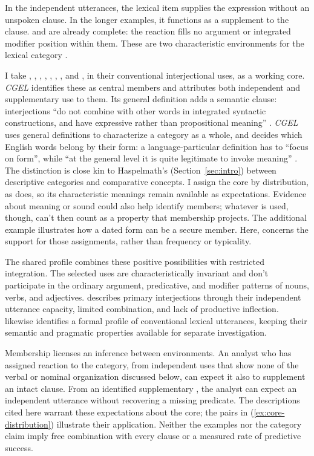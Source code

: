\documentclass[12pt]{article}
\begin{document}
In the independent utterances, the lexical item supplies the expression
without an unspoken clause. In the longer examples, it functions as
a supplement to the clause.  and  are already complete: the reaction fills no argument or integrated
modifier position within them. These are two characteristic environments
for the lexical category .

I take , , , ,
, , , and , in
their conventional interjectional uses, as a working core. \textit{CGEL}
identifies these as central members and attributes both independent
and supplementary use to them. Its general definition adds a semantic
clause: interjections \enquote{do not combine with other words in integrated
syntactic constructions, and have expressive rather than propositional
meaning} \citep[1361]{HuddlestonPullum2002}. \textit{CGEL} uses general
definitions to characterize a category as a whole, and decides which English
words belong by their form: a language-particular definition has to
\enquote{focus on form}, while \enquote{at the general level it is quite
legitimate to invoke meaning} \citep[31]{HuddlestonPullum2002}. The
distinction is close kin to Haspelmath's (Section~\ref{sec:intro}) between
descriptive categories and comparative concepts. I assign the core by distribution, as
\textcite[124]{wilkins1992} does, so its characteristic meanings remain
available as expectations. Evidence about meaning or sound could also help
identify members; whatever is used, though, can't then count as a property
that membership projects. The additional example  illustrates how a dated
form can be a secure member. Here,  concerns the support for
those assignments, rather than frequency or typicality.

The shared profile combines these positive possibilities with restricted
integration. The selected uses are characteristically invariant and don't
participate in the ordinary argument, predicative, and modifier patterns
of nouns, verbs, and adjectives. \textcite[105--106]{ameka1992} describes
primary interjections through their independent utterance capacity, limited
combination, and lack of productive inflection. \textcite[124--125]{wilkins1992}
likewise identifies a formal profile of conventional lexical utterances,
keeping their semantic and pragmatic properties available for separate
investigation.

Membership licenses an inference between environments. An analyst who
has assigned reaction  to the category, from independent
uses that show none of the verbal or nominal organization discussed below,
can expect it also to supplement an intact
clause. From an identified supplementary , the analyst can
expect an independent utterance without recovering a missing predicate.
The descriptions cited here warrant these expectations about the core;
the pairs in (\ref{ex:core-distribution}) illustrate their application.
Neither the examples nor the category claim imply free combination
with every clause or a measured rate of predictive success.
\end{document}

